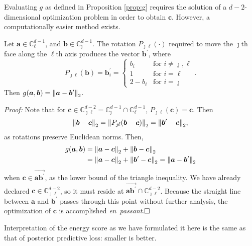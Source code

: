 Evaluating $g$ as defined in Proposition \ref{prop:g} requires the solution of a $d-2$-dimensional 
  optimization problem in order to obtain $\bm{c}$.  However, a computationally easier  method exists.
\begin{prop}
    Let $\bm{a} \in {\mathbb C}_{\ell}^{d-1}$, and $\bm{b} \in {\mathbb C}_{\jmath}^{d-1}$.  The 
  rotation $P_{\jmath\ell}(\cdot)$ required to move the $\jmath$th face along the $\ell$th axis 
  produces the vector $\bm{b}^\prime$, where
  \begin{equation}
    \label{eqn:rotation}
    P_{\jmath\ell}(\bm{b}) = \bm{b}^{\prime}_i = 
    \begin{cases}
        b_{i} &\text{for }i\neq \jmath,\ell\\
        1 &\text{for }i = \ell\\
        2 - b_{\ell} &\text{for }i = \jmath
    \end{cases}.
  \end{equation}
  Then $g(\bm{a},\bm{b}) = \pnorm{\bm{a} - \bm{b}^{\prime}}{2}$.
\end{prop}
{\em Proof:}
Note that for 
  $\bm{c} \in {\mathbb C}_{\jmath\ell}^{d-2} = {\mathbb C}_{\jmath}^{d-1}\cap{\mathbb C}_{\ell}^{d-1}$,
  $P_{\jmath\ell}(\bm{c}) = \bm{c}$.  Then
  \begin{equation*}
     \pnorm{\bm{b} - \bm{c}}{2} = \pnorm{P_{\jmath\ell}(\bm{b} - \bm{c})}{2} = \pnorm{\bm{b}^{\prime} - \bm{c}}{2},
  \end{equation*}
  as rotations preserve Euclidean norms.  Then,
  \begin{equation*}
    \begin{aligned}
    g(\bm{a}, \bm{b}) &= \pnorm{\bm{a} - \bm{c}}{2} + \pnorm{\bm{b} - \bm{c}}{2}\\
    &= \pnorm{\bm{a} - \bm{c}}{2} + \pnorm{\bm{b}^{\prime} - \bm{c}}{2} = \pnorm{\bm{a} - \bm{b}^{\prime}}{2}
    \end{aligned}
  \end{equation*}
  when $\bm{c} \in \overrightarrow{\bm{a}\bm{b}^{\prime}}$, as the lower bound of the triangle inequality.  We have already declared $\bm{c}\in{\mathbb C}_{\jmath\ell}^{d-2}$, so it must reside at $\overrightarrow{\bm{a}\bm{b}^{\prime}}\cap{\mathbb C}_{\jmath\ell}^{d-2}$.  Because the straight line between $\bm{a}$ and $\bm{b}^{\prime}$ passes through this point without further analysis, the optimization of $\bm{c}$ is accomplished \emph{en~passant}.$\hfill\Box$

Interpretation of the energy score as we have formulated it here is the same as that of posterior predictive loss: smaller is better.

